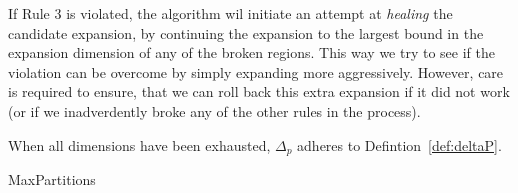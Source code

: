 If Rule 3 is violated, the algorithm wil initiate an attempt at \textit{healing}
the candidate expansion, by continuing the expansion to the largest bound in
the expansion dimension of any of the broken regions. This way we try to see if
the violation can be overcome by simply expanding more aggressively. However,
care is required to ensure, that we can roll back this extra expansion if it did
not work (or if we inadverdently broke any of the other rules in the process).

When all dimensions have been
exhausted, $\Delta_{p}$ adheres to Defintion~\ref{def:deltaP}.

\begin{algorithm}[!ht]
    \caption{MaxPartitions}\label{alg:MaxPartitions}

    \begin{algorithmic}[1]




            \item[]



                \item[]


\end{algorithmic}
\end{algorithm}
